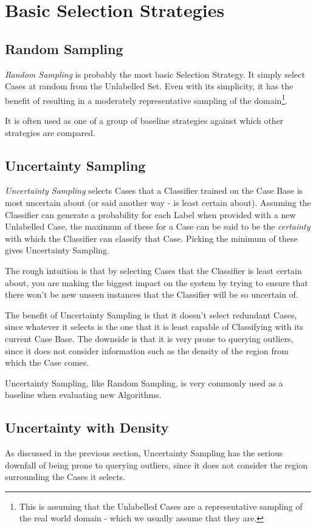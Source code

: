 \documentclass[a4paper,11pt]{report}
\begin{document}
\section{Basic Selection Strategies}
\subsection{Random Sampling}
\emph{Random Sampling} is probably the most basic Selection Strategy. It simply select Cases at random from the Unlabelled Set. Even with its simplicity, it has the benefit of resulting in a moderately representative sampling of the domain\footnote{This is assuming that the Unlabelled Cases are a representative sampling of the real world domain - which we usually assume that they are.}.

It is often used as one of a group of baseline strategies against which other strategies are compared.

\subsection{Uncertainty Sampling}
\emph{Uncertainty Sampling}\citep{Lewis1994} selects Cases that a Classifier trained on the Case Base is most uncertain about (or said another way - is least certain about). Assuming the Classifier can generate a probability for each Label when provided with a new Unlabelled Case, the maximum of these for a Case can be said to be the \emph{certainty} with which the Classifier can classify that Case. Picking the minimum of these gives Uncertainty Sampling.

The rough intuition is that by selecting Cases that the Classifier is least certain about, you are making the biggest impact on the system by trying to ensure that there won't be new unseen instances that the Classifier will be so uncertain of.

The benefit of Uncertainty Sampling is that it doesn't select redundant Cases, since whatever it selects is the one that it is least capable of Classifying with its current Case Base. The downside is that it is very prone to querying outliers, since it does not consider information such as the density of the region from which the Case comes.

Uncertainty Sampling, like Random Sampling, is very commonly used as a baseline when evaluating new Algorithms.

\subsection{Uncertainty with Density}
As discussed in the previous section, Uncertainty Sampling has the serious downfall of being prone to querying outliers, since it does not consider the region surrounding the Cases it selects.
\end{document}
